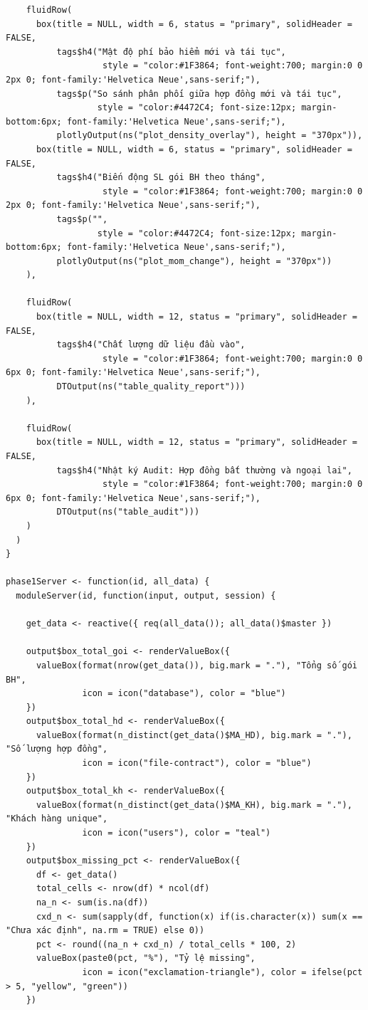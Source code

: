 \documentclass[12pt, a4paper]{article}
\begin{document}
\begin{lstlisting}
    fluidRow(
      box(title = NULL, width = 6, status = "primary", solidHeader = FALSE,
          tags$h4("Mật độ phí bảo hiểm mới và tái tục",
                   style = "color:#1F3864; font-weight:700; margin:0 0 2px 0; font-family:'Helvetica Neue',sans-serif;"),
          tags$p("So sánh phân phối giữa hợp đồng mới và tái tục",
                  style = "color:#4472C4; font-size:12px; margin-bottom:6px; font-family:'Helvetica Neue',sans-serif;"),
          plotlyOutput(ns("plot_density_overlay"), height = "370px")),
      box(title = NULL, width = 6, status = "primary", solidHeader = FALSE,
          tags$h4("Biến động SL gói BH theo tháng",
                   style = "color:#1F3864; font-weight:700; margin:0 0 2px 0; font-family:'Helvetica Neue',sans-serif;"),
          tags$p("",
                  style = "color:#4472C4; font-size:12px; margin-bottom:6px; font-family:'Helvetica Neue',sans-serif;"),
          plotlyOutput(ns("plot_mom_change"), height = "370px"))
    ),

    fluidRow(
      box(title = NULL, width = 12, status = "primary", solidHeader = FALSE,
          tags$h4("Chất lượng dữ liệu đầu vào",
                   style = "color:#1F3864; font-weight:700; margin:0 0 6px 0; font-family:'Helvetica Neue',sans-serif;"),
          DTOutput(ns("table_quality_report")))
    ),

    fluidRow(
      box(title = NULL, width = 12, status = "primary", solidHeader = FALSE,
          tags$h4("Nhật ký Audit: Hợp đồng bất thường và ngoại lai",
                   style = "color:#1F3864; font-weight:700; margin:0 0 6px 0; font-family:'Helvetica Neue',sans-serif;"),
          DTOutput(ns("table_audit")))
    )
  )
}

phase1Server <- function(id, all_data) {
  moduleServer(id, function(input, output, session) {

    get_data <- reactive({ req(all_data()); all_data()$master })

    output$box_total_goi <- renderValueBox({
      valueBox(format(nrow(get_data()), big.mark = "."), "Tổng số gói BH",
               icon = icon("database"), color = "blue")
    })
    output$box_total_hd <- renderValueBox({
      valueBox(format(n_distinct(get_data()$MA_HD), big.mark = "."), "Số lượng hợp đồng",
               icon = icon("file-contract"), color = "blue")
    })
    output$box_total_kh <- renderValueBox({
      valueBox(format(n_distinct(get_data()$MA_KH), big.mark = "."), "Khách hàng unique",
               icon = icon("users"), color = "teal")
    })
    output$box_missing_pct <- renderValueBox({
      df <- get_data()
      total_cells <- nrow(df) * ncol(df)
      na_n <- sum(is.na(df))
      cxd_n <- sum(sapply(df, function(x) if(is.character(x)) sum(x == "Chưa xác định", na.rm = TRUE) else 0))
      pct <- round((na_n + cxd_n) / total_cells * 100, 2)
      valueBox(paste0(pct, "%"), "Tỷ lệ missing",
               icon = icon("exclamation-triangle"), color = ifelse(pct > 5, "yellow", "green"))
    })


\end{lstlisting}
\end{document}
